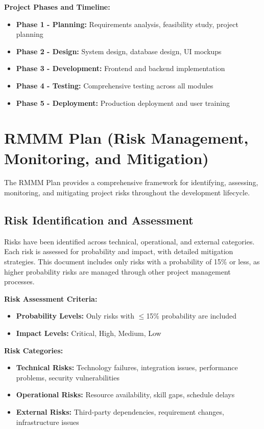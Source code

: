 \textbf{Project Phases and Timeline:}
\begin{itemize}[leftmargin=*]
    \item \textbf{Phase 1 - Planning:} Requirements analysis, feasibility study, project planning
    \item \textbf{Phase 2 - Design:} System design, database design, UI mockups
    \item \textbf{Phase 3 - Development:} Frontend and backend implementation
    \item \textbf{Phase 4 - Testing:} Comprehensive testing across all modules
    \item \textbf{Phase 5 - Deployment:} Production deployment and user training
\end{itemize}

\section{RMMM Plan (Risk Management, Monitoring, and Mitigation)}

The RMMM Plan provides a comprehensive framework for identifying, assessing, monitoring, and mitigating project risks throughout the development lifecycle.

\subsection{Risk Identification and Assessment}

Risks have been identified across technical, operational, and external categories. Each risk is assessed for probability and impact, with detailed mitigation strategies. This document includes only risks with a probability of 15\% or less, as higher probability risks are managed through other project management processes.

\textbf{Risk Assessment Criteria:}
\begin{itemize}[leftmargin=*]
    \item \textbf{Probability Levels:} Only risks with $\leq$15\% probability are included
    \item \textbf{Impact Levels:} Critical, High, Medium, Low
\end{itemize}

\textbf{Risk Categories:}
\begin{itemize}[leftmargin=*]
    \item \textbf{Technical Risks:} Technology failures, integration issues, performance problems, security vulnerabilities
    \item \textbf{Operational Risks:} Resource availability, skill gaps, schedule delays
    \item \textbf{External Risks:} Third-party dependencies, requirement changes, infrastructure issues
\end{itemize}

